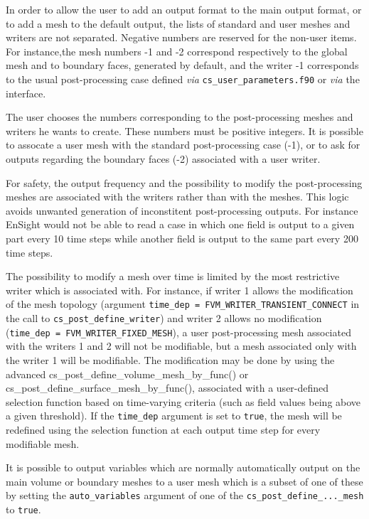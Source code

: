 {{{In order to allow the user to add an output format to
the main output format, or to add a mesh to the default
output, the lists of standard and user meshes and writers are not
separated. Negative numbers are reserved for the non-user items. For
instance,the mesh numbers -1 and -2 correspond respectively to the global
mesh and to boundary faces, generated by default, and the writer -1
corresponds to the usual post-processing case defined {\em via}
\texttt{cs\_user\_parameters.f90} or {\em via} the interface.

The user chooses the numbers corresponding to the post-processing
meshes and writers he wants to create. These numbers must be positive
integers. It is possible to assocate a user mesh with the standard
post-processing case (-1), or to ask for outputs regarding the boundary
faces (-2) associated with a user writer.

For safety, the output frequency and the possibility to modify the
post-processing meshes are associated with the writers rather than
with the meshes. This logic avoids unwanted generation of
inconstitent post-processing outputs. For instance EnSight would not
be able to read a case in which one field is output to a given part
every 10 time steps while another field is output to the same part
every 200 time steps.

The possibility to modify a mesh over time is limited by the most restrictive
writer which is associated with. For instance, if writer
1 allows the modification of the mesh topology (argument \texttt{time\_dep
= FVM\_WRITER\_TRANSIENT\_CONNECT} in the call to \texttt{cs\_post\_define\_writer}) and writer 2 allows no
modification (\texttt{time\_dep = FVM\_WRITER\_FIXED\_MESH}),
a user post-processing mesh
associated with the writers 1 and 2 will not be modifiable, but a
mesh associated only with the writer 1 will be modifiable. The
modification may be done by using the advanced
cs\_post\_define\_volume\_mesh\_by\_func() or
cs\_post\_define\_surface\_mesh\_by\_func(), associated with a user-defined
selection function based on time-varying criteria (such as field values
being above a given threshold). If the \texttt{time\_dep} argument is
set to \texttt{true}, the mesh will be redefined using the selection
function at each output time step for every modifiable mesh.

It is possible to output variables which are normally automatically
output on the main volume or boundary meshes to a user mesh which is a subset
of one of these by setting the \texttt{auto\_variables} argument of
one of the \texttt{cs\_post\_define\_...\_mesh} to \texttt{true}.

}}}
